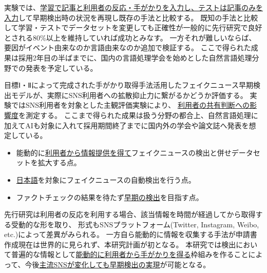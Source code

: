 実験では、\underline{学習で記事と利用者の反応・手がかりを入力し、テストは記事のみを入力}して早期検出時の状況を再現し既存の手法と比較する。
既知の手法と比較して学習・テストでデータセットを変更しても正確性が一般的に先行研究で良好とされる80\%以上を維持していれば成功とみなす。
一方それが難しいならば、要因がイベント由来なのか言語由来なのか追加で検証する。
ここで得られた成果は採用2年目の半ばまでに、国内の言語処理学会を始めとした自然言語処理分野での発表を予定している。




目標Ⅰ・Ⅱによって完成された手がかり取得手法活用したフェイクニュース早期検出モデルが、実際にSNS利用者への拡散抑止力に繋がるかどうか評価する。
実験ではSNS利用者を対象とした主観評価実験により、
\underline{利用者の共有判断への影響度}を測定する。
ここまで得られた成果は扱う分野の都合上、自然言語処理に加えてAIも対象に入れて採用期間終了までに国内外の学会や論文誌へ発表を想定している。


\vspace{20pt}
\begin{itemize}
    \setlength{\parskip}{0cm}
    \setlength{\itemsep}{0cm}
    \item 能動的に\underline{利用者から情報提供を得て}フェイクニュースの検出と併せデータセットを拡大する点。
    \item \underline{日本語}を対象にフェイクニュースの自動検出を行う点。
    \item ファクトチェックの結果を待たず\underline{早期の検出}を目指す点。
\end{itemize}
\vspace{-20pt}
先行研究は利用者の反応を利用する場合、該当情報を時間が経過してから取得する受動的な形を取り、
形式もSNSプラットフォーム(Twitter, Instagram, Weibo, etc.)によって差異がみられる。
一方自ら能動的に情報を収集する手法が申請書作成現在は世界的に見られず、本研究計画が初となる。
本研究では検出において普遍的な情報として\underline{能動的に利用者から手がかりを得る}枠組みを作ることによって、今後\underline{主流SNSが変化しても早期検出の実現}が可能となる。

